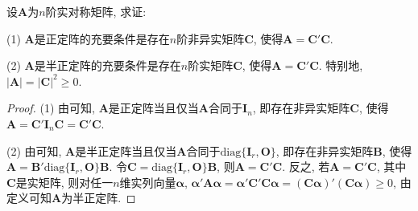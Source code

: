 \documentclass[../../main.tex]{subfiles}%
\begin{document}
\begin{proposition}[正定和半正定阵的判定准则之一]\label{proposition:正定和半正定阵的判定准则}
设$\boldsymbol{A}$为$n$阶实对称矩阵, 求证:

(1) $\boldsymbol{A}$是正定阵的充要条件是存在$n$阶非异实矩阵$\boldsymbol{C}$, 使得$\boldsymbol{A}=\boldsymbol{C}'\boldsymbol{C}$.

(2) $\boldsymbol{A}$是半正定阵的充要条件是存在$n$阶实矩阵$\boldsymbol{C}$, 使得$\boldsymbol{A}=\boldsymbol{C}'\boldsymbol{C}$. 特别地, $|\boldsymbol{A}| = |\boldsymbol{C}|^2\geqslant  0$.
\end{proposition}
\begin{proof}
(1) 由可知, $\boldsymbol{A}$是正定阵当且仅当$\boldsymbol{A}$合同于$\boldsymbol{I}_n$, 即存在非异实矩阵$\boldsymbol{C}$, 使得$\boldsymbol{A}=\boldsymbol{C}'\boldsymbol{I}_n\boldsymbol{C}=\boldsymbol{C}'\boldsymbol{C}$.

(2) 由可知, $\boldsymbol{A}$是半正定阵当且仅当$\boldsymbol{A}$合同于$\text{diag}\{\boldsymbol{I}_r, \boldsymbol{O}\}$, 即存在非异实矩阵$\boldsymbol{B}$, 使得$\boldsymbol{A}=\boldsymbol{B}'\text{diag}\{\boldsymbol{I}_r, \boldsymbol{O}\}\boldsymbol{B}$. 令$\boldsymbol{C}=\text{diag}\{\boldsymbol{I}_r, \boldsymbol{O}\}\boldsymbol{B}$, 则$\boldsymbol{A}=\boldsymbol{C}'\boldsymbol{C}$. 反之, 若$\boldsymbol{A}=\boldsymbol{C}'\boldsymbol{C}$, 其中$\boldsymbol{C}$是实矩阵, 则对任一$n$维实列向量$\boldsymbol{\alpha}$, $\boldsymbol{\alpha}'\boldsymbol{A}\boldsymbol{\alpha}=\boldsymbol{\alpha}'\boldsymbol{C}'\boldsymbol{C}\boldsymbol{\alpha}=(\boldsymbol{C}\boldsymbol{\alpha})'(\boldsymbol{C}\boldsymbol{\alpha})\geqslant  0$, 由定义可知$\boldsymbol{A}$为半正定阵.
\end{proof}
\end{document}
